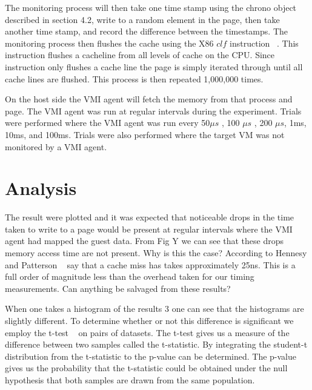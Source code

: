 \begin{algorithm}\label{CacheProbe}
\end{algorithm}


The monitoring process will then take one time stamp using the chrono object described in section 4.2, write to a random element in the page, then take another time stamp, and record the difference between the timestamps. The monitoring process then flushes the cache using the X86 $clf$ instruction ~\cite{_intel_2014}. This instruction flushes a cacheline from all levels of cache on the CPU. Since instruction only flushes a cache line the page is simply iterated through until all cache lines are flushed. This process is then repeated 1,000,000 times. 

On the host side the VMI agent will fetch the memory from that process and page. The VMI agent was run at regular intervals during the experiment. Trials were performed where the VMI agent was run every 50$\mu s$ , 100 $\mu s$ , 200 $\mu s$, 1ms, 10ms, and 100ms. Trials were also performed where the target VM was not monitored by a VMI agent. 

\section{Analysis}

The result were plotted and it was expected that noticeable drops in the time taken to write to a page would be present at regular intervals where the VMI agent had mapped the guest data. From Fig Y we can see that these drops memory access time are not present. Why is this the case? According to Hennesy and Patterson ~\cite{hennessy_computer_2012} say that a cache miss has takes approximately 25ns. This is a full order of magnitude less than the overhead taken for our timing measurements. Can anything be salvaged from these results? 

When one takes a histogram of the results 3 one can see that the histograms are slightly different. To determine whether or not this difference is significant we employ the t-test ~\cite{welch_generalization_1947} on pairs of datasets. The t-test gives us a measure of the difference between two samples called the t-statistic. By integrating the student-t distribution from the t-statistic to the p-value can be determined. The p-value gives us the probability that the t-statistic could be obtained under the null hypothesis that both samples are drawn from the same population. 


